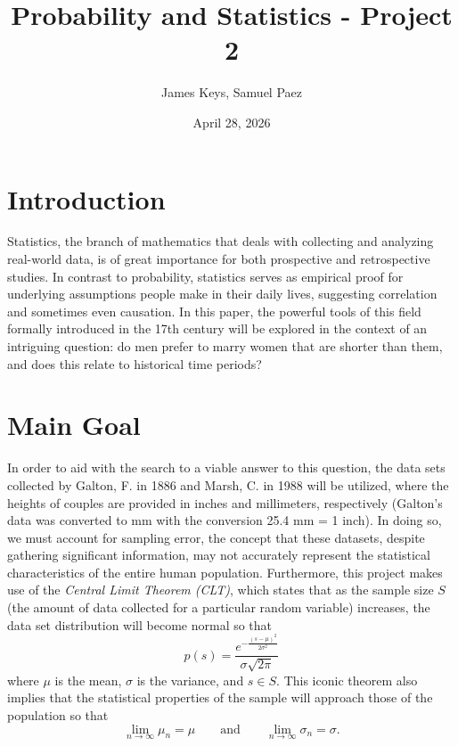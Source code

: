 \documentclass{article}
\title{Probability and Statistics - Project 2}
\author{James Keys, Samuel Paez}
\date{April 28, 2026}
\begin{document}
\maketitle

\section{Introduction}\label{sec:introduction}
Statistics, the branch of mathematics that deals with collecting and analyzing real-world data, is of great importance for both prospective and retrospective studies.
In contrast to probability, statistics serves as empirical proof for underlying assumptions people make in their daily lives, suggesting correlation and sometimes even causation.
In this paper, the powerful tools of this field formally introduced in the 17th century will be explored in the context of an intriguing question: do men prefer to marry women that are shorter than them, and does this relate to historical time periods?

\section{Main Goal}\label{sec:main-goal}
In order to aid with the search to a viable answer to this question, the data sets collected by Galton, F. in 1886 and Marsh, C. in 1988 will be utilized, where the heights of couples are provided in inches and millimeters, respectively (Galton's data was converted to mm with the conversion 25.4 mm = 1 inch).
In doing so, we must account for sampling error, the concept that these datasets, despite gathering significant information, may not accurately represent the statistical characteristics of the entire human population.
Furthermore, this project makes use of the \textit{Central Limit Theorem (CLT)}, which states that as the sample size $S$ (the amount of data collected for a particular random variable) increases, the data set distribution will become normal so that
\begin{equation}
p(s)=\frac{e^{-\frac{(s-\mu)^2}{2\sigma^2}}}{\sigma\sqrt{2\pi}}
\label{eq:normal-distribution}
\end{equation}
where $\mu$ is the mean, $\sigma$ is the variance, and $s \in S$.
This iconic theorem also implies that the statistical properties of the sample will approach those of the population so that
\begin{equation}
    \lim_{n\to\infty}\mu_n=\mu
    \qquad\text{and}\qquad
    \lim_{n\to\infty}\sigma_n=\sigma.
    \label{eq:limits-for-central-limit}
\end{equation}
\end{document}
